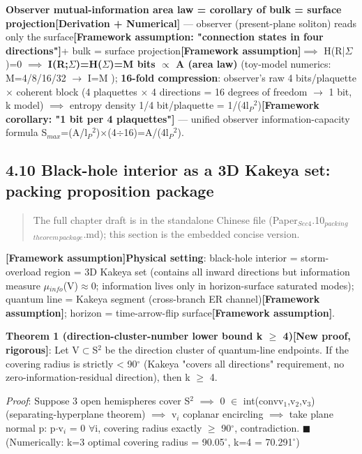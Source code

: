 \documentclass[12pt]{article}
\newcommand{\mtag}[1]{\textbf{[#1]}}
\newcommand{\up}[1]{\ensuremath{^{#1}}}
\newcommand{\down}[1]{\ensuremath{_{#1}}}
\begin{document}
\textbf{Observer mutual-information area law = corollary of bulk = surface projection}\mtag{Derivation + Numerical} --- observer (present-plane soliton) reads only the surface\mtag{Framework assumption: "connection states in four directions"}+ bulk = surface projection\mtag{Framework assumption}\ensuremath{\implies} H(R|\ensuremath{\Sigma})=0 \ensuremath{\implies} \textbf{I(R;\ensuremath{\Sigma})=H(\ensuremath{\Sigma})=M bits \ensuremath{\propto} A (area law)} (toy-model numerics: M=4/8/16/32 \ensuremath{\to} I=M \checkmark); \textbf{16-fold compression}: observer's raw 4 bits/plaquette \ensuremath{\times} coherent block (4 plaquettes \ensuremath{\times} 4 directions = 16 degrees of freedom \ensuremath{\to} 1 bit, k model) \ensuremath{\implies} entropy density 1/4 bit/plaquette = 1/(4l\down{P}\up{2})\mtag{Framework corollary: "1 bit per 4 plaquettes"} --- unified observer information-capacity formula S\down{max}=(A/l\down{P}\up{2})\ensuremath{\times}(4\ensuremath{\div}16)=A/(4l\down{P}\up{2}).

\subsection{4.10 Black-hole interior as a 3D Kakeya set: packing proposition package}

\begin{quote}
The full chapter draft is in the standalone Chinese file (Paper\down{Sec4}.10\down{packing}\down{theorem}\down{package}.md); this section is the embedded concise version.
\end{quote}

\textbf{\mtag{Framework assumption}Physical setting}: black-hole interior = storm-overload region = 3D Kakeya set (contains all inward directions but information measure \ensuremath{\mu}\down{info}(V)\ensuremath{\approx}0; information lives only in horizon-surface saturated modes); quantum line = Kakeya segment (cross-branch ER channel)\mtag{Framework assumption}; horizon = time-arrow-flip surface\mtag{Framework assumption}.

\textbf{Theorem 1 (direction-cluster-number lower bound k \ensuremath{\geq} 4)\mtag{New proof, rigorous}}: Let V\ensuremath{\subset}S\up{2} be the direction cluster of quantum-line endpoints. If the covering radius is strictly < 90\ensuremath{^{\circ}} (Kakeya "covers all directions" requirement, no zero-information-residual direction), then k \ensuremath{\geq} 4.

\textit{Proof}: Suppose 3 open hemispheres cover S\up{2} \ensuremath{\implies} 0 \ensuremath{\in} int(conv{v\down{1},v\down{2},v\down{3}}) (separating-hyperplane theorem) \ensuremath{\implies} v\down{i} coplanar encircling \ensuremath{\implies} take plane normal p: p\ensuremath{\cdot}v\down{i} = 0 \ensuremath{\forall}i, covering radius exactly \ensuremath{\geq} 90\ensuremath{^{\circ}}, contradiction. \ensuremath{\blacksquare} (Numerically: k=3 optimal covering radius = 90.05\ensuremath{^{\circ}}, k=4 = 70.291\ensuremath{^{\circ}})
\end{document}
